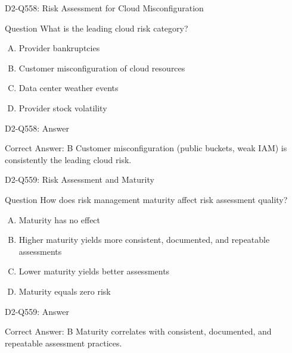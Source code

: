 \documentclass{beamer}
\begin{document}
	\begin{frame}{D2-Q558: Risk Assessment for Cloud Misconfiguration}
		\begin{block}{Question}
			What is the leading cloud risk category?
		\end{block}
		\begin{enumerate}[(A)]
			\item Provider bankruptcies
			\item Customer misconfiguration of cloud resources
			\item Data center weather events
			\item Provider stock volatility
		\end{enumerate}
	\end{frame}
	\begin{frame}{D2-Q558: Answer}
		\begin{block}{Correct Answer: B}
			Customer misconfiguration (public buckets, weak IAM) is consistently the leading cloud risk.
		\end{block}
	\end{frame}
	
	\begin{frame}{D2-Q559: Risk Assessment and Maturity}
		\begin{block}{Question}
			How does risk management maturity affect risk assessment quality?
		\end{block}
		\begin{enumerate}[(A)]
			\item Maturity has no effect
			\item Higher maturity yields more consistent, documented, and repeatable assessments
			\item Lower maturity yields better assessments
			\item Maturity equals zero risk
		\end{enumerate}
	\end{frame}
	\begin{frame}{D2-Q559: Answer}
		\begin{block}{Correct Answer: B}
			Maturity correlates with consistent, documented, and repeatable assessment practices.
		\end{block}
	\end{frame}
	
\end{document}
